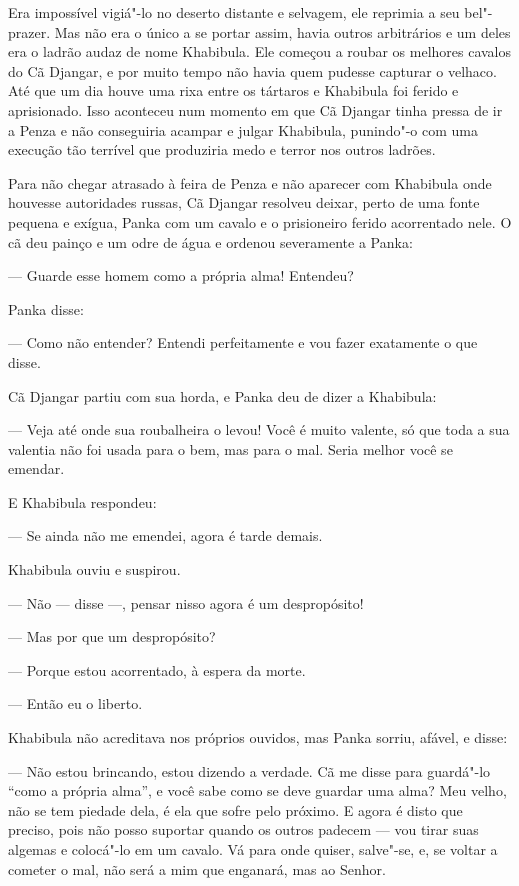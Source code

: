 Era impossível vigiá"-lo no deserto distante e selvagem, ele reprimia a
seu bel"-prazer. Mas não era o único a se portar assim, havia outros
arbitrários e um deles era o ladrão audaz de nome Khabibula. Ele começou
a roubar os melhores cavalos do Cã Djangar, e por muito tempo não havia
quem pudesse capturar o velhaco. Até que um dia houve uma rixa entre os
tártaros e Khabibula foi ferido e aprisionado. Isso aconteceu num
momento em que Cã Djangar tinha pressa de ir a Penza e não conseguiria
acampar e julgar Khabibula, punindo"-o com uma execução tão terrível que
produziria medo e terror nos outros ladrões.

Para não chegar atrasado à feira de Penza e não aparecer com Khabibula
onde houvesse autoridades russas, Cã Djangar resolveu deixar, perto de
uma fonte pequena e exígua, Panka com um cavalo e o prisioneiro ferido
acorrentado nele. O cã deu painço e um odre de água e ordenou
severamente a Panka:

--- Guarde esse homem como a própria alma! Entendeu?

Panka disse:

--- Como não entender? Entendi perfeitamente e vou fazer exatamente o
que disse.

Cã Djangar partiu com sua horda, e Panka deu de dizer a Khabibula:

--- Veja até onde sua roubalheira o levou! Você é muito valente, só
que toda a sua valentia não foi usada para o bem, mas para o mal. Seria
melhor você se emendar.

E Khabibula respondeu:

--- Se ainda não me emendei, agora é tarde demais.


Khabibula ouviu e suspirou.

--- Não --- disse ---, pensar nisso agora é um despropósito!

--- Mas por que um despropósito?

--- Porque estou acorrentado, à espera da morte.

--- Então eu o liberto.

Khabibula não acreditava nos próprios ouvidos, mas Panka sorriu, afável,
e disse:

--- Não estou brincando, estou dizendo a verdade. Cã me disse para
guardá"-lo ``como a própria alma'', e você sabe como se deve guardar uma
alma? Meu velho, não se tem piedade dela, é ela que sofre pelo próximo.
E agora é disto que preciso, pois não posso suportar quando os outros
padecem --- vou tirar suas algemas e colocá"-lo em um cavalo. Vá para
onde quiser, salve"-se, e, se voltar a cometer o mal, não será a mim que
enganará, mas ao Senhor.

